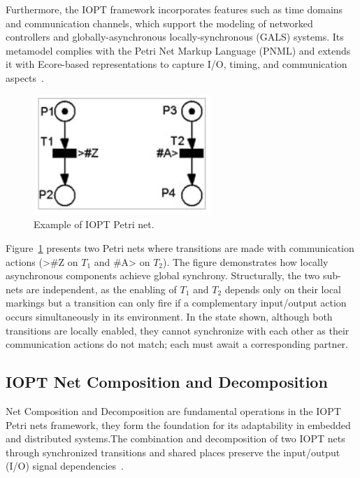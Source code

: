 Furthermore, the IOPT framework incorporates features such as time domains and communication channels, which support the modeling of networked controllers and globally-asynchronous locally-synchronous (GALS) systems. Its metamodel complies with the Petri Net Markup Language (PNML) and extends it with Ecore-based representations to capture I/O, timing, and communication aspects~\cite{iopttools}.


\begin{figure}[htbp]
  \centering
  \includegraphics[width=0.6\textwidth]{Chapters/Figures/petrisplit.jpg}
  \caption{Example of IOPT Petri net.}
  \label{fig:petrisplit}
\end{figure}


Figure~\ref{fig:petrisplit} presents two Petri nets where transitions are made with communication actions (>\#Z on $T_1$ and \#A> on $T_2$). The figure demonstrates how locally asynchronous components achieve global synchrony. Structurally, the two sub-nets are independent, as the enabling of $T_1$ and $T_2$ depends only on their local markings but a transition can only fire if a complementary input/output action occurs simultaneously in its environment. In the state shown, although both transitions are locally enabled, they cannot synchronize with each other as their communication actions do not match; each must await a corresponding partner.



\subsection{IOPT Net Composition and Decomposition}
\label{sub:net_addicion}

Net Composition and Decomposition are fundamental operations in the IOPT Petri nets framework, they form the foundation for its adaptability in embedded and distributed systems.The combination and decomposition of two IOPT nets through synchronized transitions and shared places preserve the input/output (I/O) signal dependencies~\cite{add1}.

